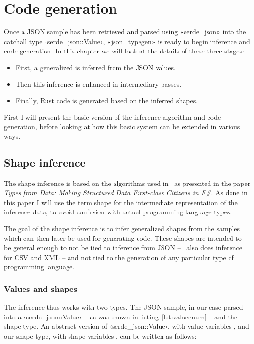 
\chapter{Code generation}
\label{sec:code-generation}

Once a JSON sample has been retrieved and parsed using «serde_json» into the catchall type ‹serde_json::Value›, «json_typegen» is ready to begin inference and code generation. In this chapter we will look at the details of these three stages:

\begin{itemize}
  \item First, a generalized  is inferred from the JSON values.
  \item Then this inference is enhanced in intermediary passes.
  \item Finally, Rust code is generated based on the inferred shapes.
\end{itemize}

First I will present the basic version of the inference algorithm and code generation, before looking at how this basic system can be extended in various ways.

\section{Shape inference}
\label{sec:shape-inference}

The shape inference is based on the algorithms used in \fsharpdata\ as presented in the paper \emph{Types from Data: Making Structured Data First-class Citizens in F\#}\cite{fsharp-types-from-data}. As done in this paper I will use the term shape for the intermediate representation of the inference data, to avoid confusion with actual programming language types.

The goal of the shape inference is to infer generalized shapes from the samples which can then later be used for generating code. These shapes are intended to be general enough to not be tied to inference from JSON -- \fsharpdata\ also does inference for CSV and XML -- and not tied to the generation of any particular type of programming language.

\subsection{Values and shapes}

The inference thus works with two types. The JSON sample, in our case parsed into a ‹serde_json::Value› -- as was shown in listing~\ref{lst:valueenum} -- and the shape type. An abstract version of ‹serde_json::Value›, with value variables \omega, and our shape type, with shape variables \sigma, can be written as follows:

